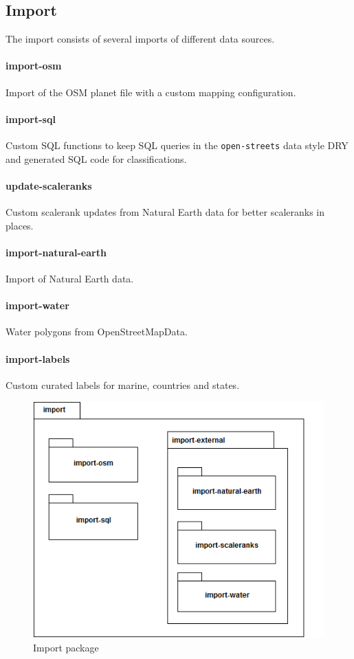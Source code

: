 \newpage
\subsection{Import}

The import consists of several imports of different data sources.

\paragraph{import-osm}
Import of the OSM planet file with a custom mapping configuration.

\paragraph{import-sql}
Custom SQL functions to keep SQL queries in the \texttt{open-streets} data style DRY and generated SQL code for classifications. 

\paragraph{update-scaleranks}
Custom scalerank updates from Natural Earth data for better scaleranks in places.

\paragraph{import-natural-earth}
Import of Natural Earth data.

\paragraph{import-water}
Water polygons from OpenStreetMapData.

\paragraph{import-labels}
Custom curated labels for marine, countries and states.

\begin{figure}[H]
  \includegraphics[scale=0.6]{images/import_export_package_diagram.png}
  \caption{Import package}
\end{figure}


